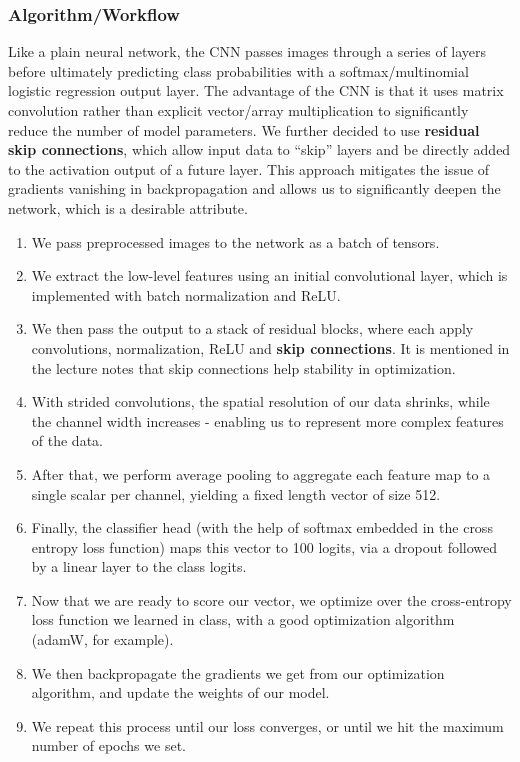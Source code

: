 \documentclass[10pt]{article} %
\begin{document}
\subsubsection{Algorithm/Workflow}\cite{resnet}
Like a plain neural network, the CNN passes images through a series of layers before ultimately predicting class probabilities with a softmax/multinomial logistic regression output layer. The advantage of the CNN is that it uses matrix convolution rather than explicit vector/array multiplication to significantly reduce the number of model parameters. We further decided to use \textbf{residual skip connections}, which allow input data to ``skip'' layers and be directly added to the activation output of a future layer. This approach mitigates the issue of gradients vanishing in backpropagation and allows us to significantly deepen the network, which is a desirable attribute.
\begin{enumerate}
  \item We pass preprocessed images to the network as a batch of tensors.
  \item We extract the low-level features using an initial convolutional layer, which is implemented with batch normalization and ReLU.
  \item We then pass the output to a stack of residual blocks, where each apply convolutions, normalization, ReLU and \textbf{skip connections}. It is mentioned in the lecture notes that skip connections help stability in optimization.
  \item With strided convolutions, the spatial resolution of our data shrinks, while the channel width increases - enabling us to represent more complex features of the data.
  \item After that, we perform average pooling to aggregate each feature map to a single scalar per channel, yielding a fixed length vector of size 512.
  \item Finally, the classifier head (with the help of softmax embedded in the cross entropy loss function) maps this vector to 100 logits, via a dropout followed by a linear layer to the class logits.
  \item Now that we are ready to score our vector, we optimize over the cross-entropy loss function we learned in class, with a good optimization algorithm (adamW, for example).
  \item We then backpropagate the gradients we get from our optimization algorithm, and update the weights of our model.
  \item We repeat this process until our loss converges, or until we hit the maximum number of epochs we set.
\end{enumerate}
\end{document}

